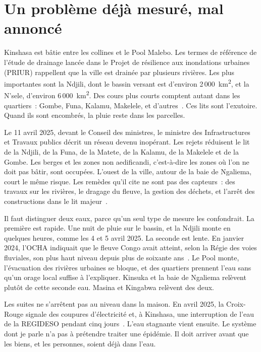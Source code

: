 \documentclass[12pt,a4paper]{article}
\begin{document}
\section{Un problème déjà mesuré, mal annoncé}
\label{sec:probleme}

Kinshasa est bâtie entre les collines et le Pool Malebo. Les termes de référence de l'étude de drainage lancée dans le Projet de résilience aux inondations urbaines (PRIUR) rappellent que la ville est drainée par plusieurs rivières. Les plus importantes sont la Ndjili, dont le bassin versant est d'environ 2\,000~km\textsuperscript{2}, et la N'sele, d'environ 6\,000~km\textsuperscript{2}. Des cours plus courts comptent autant dans les quartiers~: Gombe, Funa, Kalamu, Makelele, et d'autres~\cite{priur2026}. Ces lits sont l'exutoire. Quand ils sont encombrés, la pluie reste dans les parcelles.

Le 11 avril 2025, devant le Conseil des ministres, le ministre des Infrastructures et Travaux publics décrit un réseau devenu inopérant. Les rejets réduisent le lit de la Ndjili, de la Funa, de la Matete, de la Kalamu, de la Makelele et de la Gombe. Les berges et les zones non aedificandi, c'est-à-dire les zones où l'on ne doit pas bâtir, sont occupées. L'ouest de la ville, autour de la baie de Ngaliema, court le même risque. Les remèdes qu'il cite ne sont pas des capteurs~: des travaux sur les rivières, le dragage du fleuve, la gestion des déchets, et l'arrêt des constructions dans le lit majeur~\cite{conseil2025}.

Il faut distinguer deux eaux, parce qu'un seul type de mesure les confondrait. La première est rapide. Une nuit de pluie sur le bassin, et la Ndjili monte en quelques heures, comme les 4 et 5 avril 2025. La seconde est lente. En janvier 2024, l'OCHA indiquait que le fleuve Congo avait atteint, selon la Régie des voies fluviales, son plus haut niveau depuis plus de soixante ans~\cite{ocha2024}. Le Pool monte, l'évacuation des rivières urbaines se bloque, et des quartiers prennent l'eau sans qu'un orage local suffise à l'expliquer. Kinsuka et la baie de Ngaliema relèvent plutôt de cette seconde eau. Masina et Kingabwa relèvent des deux.

Les suites ne s'arrêtent pas au niveau dans la maison. En avril 2025, la Croix-Rouge signale des coupures d'électricité et, à Kinshasa, une interruption de l'eau de la REGIDESO pendant cinq jours~\cite{ifrc2025}. L'eau stagnante vient ensuite. Le système dont je parle n'a pas à prétendre traiter une épidémie. Il doit arriver avant que les biens, et les personnes, soient déjà dans l'eau.
\end{document}

